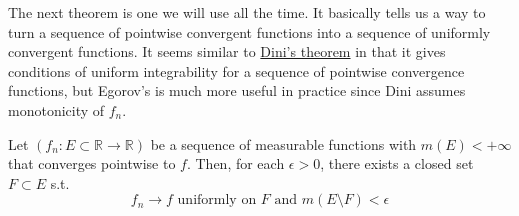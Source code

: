   The next theorem is one we will use all the time. It basically tells us a way to turn a sequence of pointwise convergent functions into a sequence of uniformly convergent functions. It seems similar to \hyperref[real-thm:dini]{Dini's theorem} in that it gives conditions of uniform integrability for a sequence of pointwise convergence functions, but Egorov's is much more useful in practice since Dini assumes monotonicity of $f_n$. 

  \begin{theorem}[Egorov]
    Let $(f_n: E \subset \mathbb{R} \to \mathbb{R})$ be a sequence of measurable functions with $m(E) < +\infty$ that converges pointwise to $f$. Then, for each $\epsilon > 0$, there exists a closed set $F \subset E$  s.t. 
    \begin{equation}
      f_n \to f \text{ uniformly on } F \text{ and } m(E \setminus F) < \epsilon
    \end{equation}
  \end{theorem}
